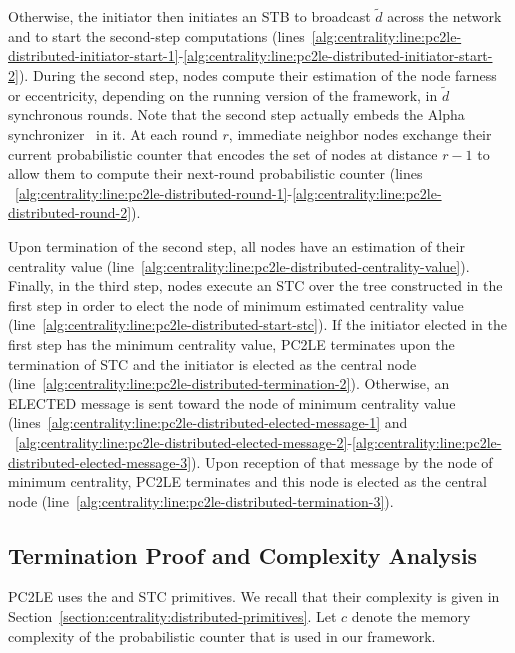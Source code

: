 Otherwise, the initiator then initiates an STB to broadcast $\tilde{d}$ across the network and to start the second-step computations (lines~\ref{alg:centrality:line:pc2le-distributed-initiator-start-1}-\ref{alg:centrality:line:pc2le-distributed-initiator-start-2}). During the second step, nodes compute their estimation of the node farness or eccentricity, depending on the running version of the framework, in $\tilde{d}$ synchronous rounds. Note that the second step actually embeds the Alpha synchronizer~\cite{awerbuch1985complexity,lynch1996distributed,raynal2013distributed} in it. At each round $r$, immediate neighbor nodes exchange their current probabilistic counter that encodes the set of nodes at distance $r-1$ to allow them to compute their next-round probabilistic counter (lines ~\ref{alg:centrality:line:pc2le-distributed-round-1}-\ref{alg:centrality:line:pc2le-distributed-round-2}). 

Upon termination of the second step, all nodes have an estimation of their centrality value (line~\ref{alg:centrality:line:pc2le-distributed-centrality-value}). Finally, in the third step, nodes execute an STC over the tree constructed in the first step in order to elect the node of minimum estimated centrality value (line~\ref{alg:centrality:line:pc2le-distributed-start-stc}). If the initiator elected in the first step has the minimum centrality value, PC2LE terminates upon the termination of STC and the initiator is elected as the central node (line~\ref{alg:centrality:line:pc2le-distributed-termination-2}). Otherwise, an ELECTED message is sent toward the node of minimum centrality value (lines~\ref{alg:centrality:line:pc2le-distributed-elected-message-1} and ~\ref{alg:centrality:line:pc2le-distributed-elected-message-2}-\ref{alg:centrality:line:pc2le-distributed-elected-message-3}). Upon reception of that message by the node of minimum centrality, PC2LE terminates and this node is elected as the central node (line~\ref{alg:centrality:line:pc2le-distributed-termination-3}).

\subsection{Termination Proof and Complexity Analysis}
\label{section:centrality:pc2le-complexity}

PC2LE uses the \cheungIeCbAgg{} and STC primitives. We recall that their complexity is given in Section~\ref{section:centrality:distributed-primitives}. Let $c$ denote the memory complexity of the probabilistic counter that is used in our framework.

